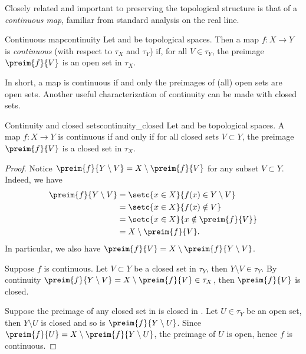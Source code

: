 Closely related and important to preserving the topological structure is that of a \emph{continuous map}, familiar from standard analysis on the real line.
\begin{definition}{Continuous map}{continuity}
    Let  and  be topological spaces. Then a map \(f : X \to Y\) is \emph{continuous} (with respect to \(\tau_X\) and \(\tau_Y\)) if, for all \(V \in \tau_Y\), the preimage \(\preim{f}{V}\) is an open set in \(\tau_X\).
\end{definition}

In short, a map is continuous if and only the preimages of (all) open sets are open sets. Another useful characterization of continuity can be made with closed sets.
\begin{proposition}{Continuity and closed sets}{continuity_closed}
    Let  and  be topological spaces. A map \(f : X \to Y\) is continuous if and only if for all closed sets \(V \subset Y\), the preimage \(\preim{f}{V}\) is a closed set in \(\tau_X\).
\end{proposition}
\begin{proof}
    Notice \(\preim{f}{Y\setminus V} = X \setminus \preim{f}{V}\) for any subset \(V \subset Y\). Indeed, we have
    \begin{align*}
        \preim{f}{Y \setminus V} &= \setc{x \in X}{f(x) \in Y \setminus V}\\&= \setc{x \in X}{f(x) \notin V}\\&=\setc{x \in X}{x \notin \preim{f}{V}}\\&= X \setminus \preim{f}{V}.
    \end{align*}
    In particular, we also have \(\preim{f}{V} = X \setminus \preim{f}{Y\setminus V}\).

    Suppose \(f\) is continuous. Let \(V \subset Y\) be a closed set in \(\tau_Y\), then \(Y\setminus V \in \tau_Y\). By continuity \(\preim{f}{Y \setminus V} = X \setminus\preim{f}{V} \in \tau_X\), then \(\preim{f}{V}\) is closed.

    Suppose the preimage of any closed set in  is closed in . Let \(U \in \tau_Y\) be an open set, then \(Y\setminus U\) is closed and so is \(\preim{f}{Y\setminus U}\). Since \(\preim{f}{U} = X \setminus \preim{f}{Y\setminus U}\), the preimage of \(U\) is open, hence \(f\) is continuous.
\end{proof}

